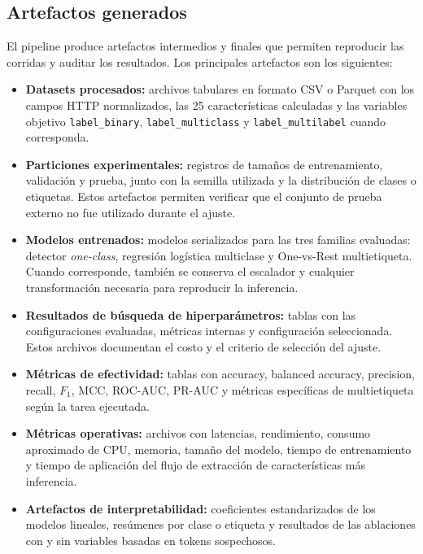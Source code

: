 \documentclass[12pt,oneside]{report}
\begin{document}
\subsection{Artefactos generados}

El pipeline produce artefactos intermedios y finales que permiten reproducir las corridas y auditar los resultados. Los principales artefactos son los siguientes:

\begin{itemize}[leftmargin=*]
  \item \textbf{Datasets procesados:} archivos tabulares en formato CSV o Parquet con los campos HTTP normalizados, las 25 características calculadas y las variables objetivo \texttt{label\_binary}, \texttt{label\_multiclass} y \texttt{label\_multilabel} cuando corresponda.
  \item \textbf{Particiones experimentales:} registros de tamaños de entrenamiento, validación y prueba, junto con la semilla utilizada y la distribución de clases o etiquetas. Estos artefactos permiten verificar que el conjunto de prueba externo no fue utilizado durante el ajuste.
  \item \textbf{Modelos entrenados:} modelos serializados para las tres familias evaluadas: detector \textit{one-class}, regresión logística multiclase y One-vs-Rest multietiqueta. Cuando corresponde, también se conserva el escalador y cualquier transformación necesaria para reproducir la inferencia.
  \item \textbf{Resultados de búsqueda de hiperparámetros:} tablas con las configuraciones evaluadas, métricas internas y configuración seleccionada. Estos archivos documentan el costo y el criterio de selección del ajuste.
  \item \textbf{Métricas de efectividad:} tablas con accuracy, balanced accuracy, precision, recall, $F_1$, MCC, ROC-AUC, PR-AUC y métricas específicas de multietiqueta según la tarea ejecutada.
  \item \textbf{Métricas operativas:} archivos con latencias, rendimiento, consumo aproximado de CPU, memoria, tamaño del modelo, tiempo de entrenamiento y tiempo de aplicación del flujo de extracción de características más inferencia.
  \item \textbf{Artefactos de interpretabilidad:} coeficientes estandarizados de los modelos lineales, resúmenes por clase o etiqueta y resultados de las ablaciones con y sin variables basadas en tokens sospechosos.
\end{itemize}
\end{document}
